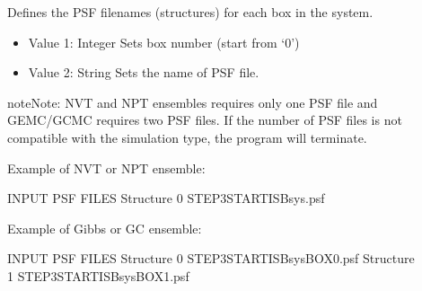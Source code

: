 \documentclass[letterpaper,10pt,english]{sphinxmanual}
\begin{document}
\begin{description}
\item[{}] \leavevmode
Defines the PSF filenames (structures) for each box in the system.
\begin{itemize}
\item {} 
Value 1: Integer \sphinxhyphen{} Sets box number (start from ‘0’)

\item {} 
Value 2: String \sphinxhyphen{} Sets the name of PSF file.

\end{itemize}

\begin{sphinxadmonition}{note}{Note:}
NVT and NPT ensembles requires only one PSF file and GEMC/GCMC requires two PSF files. If the number of PSF files is not compatible with the simulation type, the program will terminate.
\end{sphinxadmonition}

Example of NVT or NPT ensemble:

\begin{sphinxVerbatim}[commandchars=\\\{\}]
\PYGZsh{}\PYGZsh{}\PYGZsh{}\PYGZsh{}\PYGZsh{}\PYGZsh{}\PYGZsh{}\PYGZsh{}\PYGZsh{}\PYGZsh{}\PYGZsh{}\PYGZsh{}\PYGZsh{}\PYGZsh{}\PYGZsh{}\PYGZsh{}\PYGZsh{}\PYGZsh{}\PYGZsh{}\PYGZsh{}\PYGZsh{}\PYGZsh{}\PYGZsh{}\PYGZsh{}\PYGZsh{}\PYGZsh{}\PYGZsh{}\PYGZsh{}\PYGZsh{}\PYGZsh{}\PYGZsh{}\PYGZsh{}\PYGZsh{}
\PYGZsh{} INPUT PSF FILES
\PYGZsh{}\PYGZsh{}\PYGZsh{}\PYGZsh{}\PYGZsh{}\PYGZsh{}\PYGZsh{}\PYGZsh{}\PYGZsh{}\PYGZsh{}\PYGZsh{}\PYGZsh{}\PYGZsh{}\PYGZsh{}\PYGZsh{}\PYGZsh{}\PYGZsh{}\PYGZsh{}\PYGZsh{}\PYGZsh{}\PYGZsh{}\PYGZsh{}\PYGZsh{}\PYGZsh{}\PYGZsh{}\PYGZsh{}\PYGZsh{}\PYGZsh{}\PYGZsh{}\PYGZsh{}\PYGZsh{}\PYGZsh{}\PYGZsh{}
Structure   0   STEP3\PYGZus{}START\PYGZus{}ISB\PYGZus{}sys.psf
\end{sphinxVerbatim}

Example of Gibbs or GC ensemble:

\begin{sphinxVerbatim}[commandchars=\\\{\}]
\PYGZsh{}\PYGZsh{}\PYGZsh{}\PYGZsh{}\PYGZsh{}\PYGZsh{}\PYGZsh{}\PYGZsh{}\PYGZsh{}\PYGZsh{}\PYGZsh{}\PYGZsh{}\PYGZsh{}\PYGZsh{}\PYGZsh{}\PYGZsh{}\PYGZsh{}\PYGZsh{}\PYGZsh{}\PYGZsh{}\PYGZsh{}\PYGZsh{}\PYGZsh{}\PYGZsh{}\PYGZsh{}\PYGZsh{}\PYGZsh{}\PYGZsh{}\PYGZsh{}\PYGZsh{}\PYGZsh{}\PYGZsh{}\PYGZsh{}
\PYGZsh{} INPUT PSF FILES
\PYGZsh{}\PYGZsh{}\PYGZsh{}\PYGZsh{}\PYGZsh{}\PYGZsh{}\PYGZsh{}\PYGZsh{}\PYGZsh{}\PYGZsh{}\PYGZsh{}\PYGZsh{}\PYGZsh{}\PYGZsh{}\PYGZsh{}\PYGZsh{}\PYGZsh{}\PYGZsh{}\PYGZsh{}\PYGZsh{}\PYGZsh{}\PYGZsh{}\PYGZsh{}\PYGZsh{}\PYGZsh{}\PYGZsh{}\PYGZsh{}\PYGZsh{}\PYGZsh{}\PYGZsh{}\PYGZsh{}\PYGZsh{}\PYGZsh{}
Structure   0   STEP3\PYGZus{}START\PYGZus{}ISB\PYGZus{}sys\PYGZus{}BOX\PYGZus{}0.psf
Structure   1   STEP3\PYGZus{}START\PYGZus{}ISB\PYGZus{}sys\PYGZus{}BOX\PYGZus{}1.psf
\end{sphinxVerbatim}


\end{description}
\end{document}
